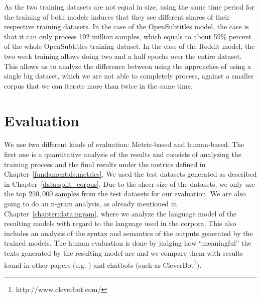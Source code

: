 As the two training datasets are not equal in size, using the same time period for the training of both models induces that they see different shares of their respective training datasets. In the case of the OpenSubtitles model, the case is that it can only process 192 million samples, which equals to about 59\% percent of the whole OpenSubtitles training dataset. In the case of the Reddit model, the two week training allows doing two and a half epochs over the entire dataset. This allows us to analyze the difference between using the approaches of using a single big dataset, which we are not able to completely process, against a smaller corpus that we can iterate more than twice in the same time.

\section{Evaluation}
\label{methods:evaluation}
We use two different kinds of evaluation: Metric-based and human-based. The first one is a quantitative analysis of the results and consists of analyzing the training process and the final results under the metrics defined in Chapter~\ref{fundamentals:metrics}. We used the test datasets generated as described in Chapter~\ref{data:split_corpus}. Due to the sheer size of the datasets, we only use the top $250,000$ samples from the test datasets for our evaluation. We are also going to do an n-gram analysis, as already mentioned in Chapter~\ref{chapter:data:ngram}, where we analyze the language model of the resulting models with regard to the language used in the corpora. This also includes an analysis of the syntax and semantics of the outputs generated by the trained models. The human evaluation is done by judging how ``meaningful'' the texts generated by the resulting model are and we compare them with results found in other papers (e.g. \cite{Vinyals:2015}) and chatbots (such as CleverBot\footnote{http://www.cleverbot.com/}).

